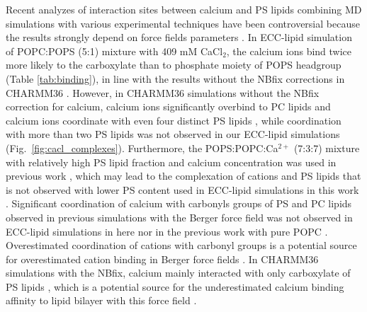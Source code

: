 \documentclass[journal=jpcbfk,manuscript=article]{achemso}
\begin{document}
Recent analyzes of interaction sites between calcium and PS lipids combining
MD simulations with various experimental techniques have been 
controversial because the results strongly depend on force fields parameters \cite{melcrova16,valentine18,hallock18}.
In ECC-lipid simulation of POPC:POPS (5:1) mixture with 409 mM CaCl$_2$,
the calcium ions bind twice more likely to the carboxylate than to phosphate moiety of POPS headgroup
 (Table \ref{tab:binding}),
in line with the results without the NBfix corrections in CHARMM36 \cite{hallock18}.
However, in CHARMM36 simulations without the NBfix correction for calcium,
calcium ions significantly overbind to PC lipids  \cite{catte16} and calcium ions coordinate
with even four distinct PS lipids \cite{hallock18}, while coordination with more than two PS lipids
was not observed in our ECC-lipid simulations (Fig.~\ref{fig:cacl_complexes}).
Furthermore, the POPS:POPC:Ca$^{2+}$ (7:3:7) mixture with relatively high
PS lipid fraction and calcium concentration was used in previous work \cite{hallock18},
which may lead to the complexation of  cations and PS lipids that is
not observed with lower PS content used in ECC-lipid simulations in this work \cite{hauser77,kurland79,hauser85,feigenson86,mattai89,roux90,roux91}.
Significant coordination of calcium with carbonyls groups of PS and PC lipids observed in previous
simulations with the Berger force field \cite{melcrova16} %
was not observed in ECC-lipid simulations in here nor in the previous work with pure POPC \cite{melcr18}.
Overestimated coordination of cations with carbonyl groups is a potential source for
overestimated cation binding in Berger force fields \cite{catte16,NMRlipidsIV}. 
In CHARMM36 simulations with the NBfix, calcium mainly interacted with only
carboxylate of PS lipids  \cite{valentine18}, which is a potential source for the
underestimated calcium binding affinity to lipid bilayer with this force field \cite{NMRlipidsIV}. 
\end{document}
